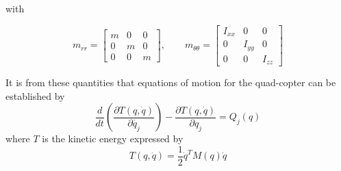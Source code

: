\documentclass[twocolumn,10pt]{asme2e}
\begin{document}
{with

\begin{equation}
m_{rr}=\left[\begin{array}{ccc}
	m & 0 & 0\\
	0 & m & 0\\
	0 & 0 & m
\end{array}\right],\qquad
m_{\theta\theta}=\left[\begin{array}{ccc}
	I_{xx} & 0 & 0\\
	0 & I_{yy} & 0\\
	0 & 0 & I_{zz}
\end{array}\right]
\end{equation}

It is from these quantities that equations of motion for the quad-copter can be established by
\begin{equation}
\frac{d}{dt}\left(\frac{\partial T(q,\dot{q})}{\partial\dot{q_{j}}}\right)-\frac{\partial T(q,\dot{q})}{\partial q_{j}}=Q_{j}(q)\label{eqL}
\end{equation}
 where $T$ is the kinetic energy  expressed  by
\begin{equation}
T(q,\dot{q})=\frac{1}{2}\dot{q}^{T}M(q)\dot{q}
\end{equation}
%

}
\end{document}
